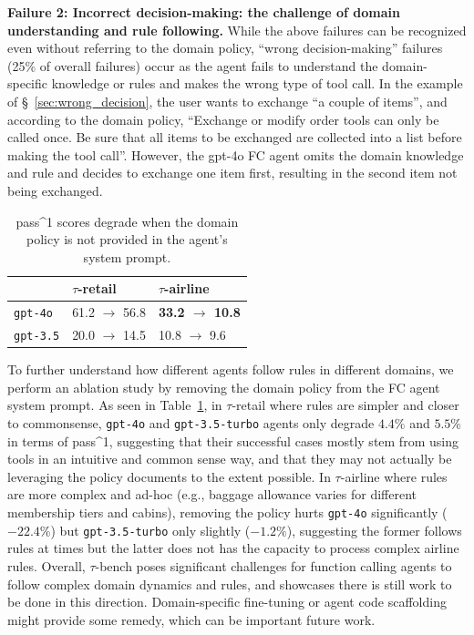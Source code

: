 \documentclass{article}
\newcommand{\benchmark}{$\tau$-bench}
\newcommand{\retail}{$\tau$-retail}  %
\newcommand{\airline}{$\tau$-airline}
\begin{document}
\textbf{Failure 2: Incorrect decision-making: the challenge of domain understanding and rule following.} While the above failures can be recognized even without referring to the domain policy, ``wrong decision-making'' failures (25\% of overall failures) occur as the agent fails to understand the domain-specific knowledge or rules and makes the wrong type of tool call. In the example of \S~\ref{sec:wrong_decision}, the user wants to exchange ``a couple of items'', and according to the domain policy, ``Exchange or modify order tools can only be called once. Be sure that all items to be exchanged are collected into a list before making the tool call''. However, the gpt-4o FC agent omits the domain knowledge and rule and decides to exchange one item first, resulting in the second item not being exchanged. 

\begin{table}
\vspace{-10pt}
    
    \small
    \begin{tabular}{l|ll}
    \toprule
        & \retail & \airline \\
    \midrule
    \texttt{gpt-4o} & 61.2 $\to$ 56.8 & \textbf{33.2 $\to$ 10.8} \\
    \texttt{gpt-3.5} & 20.0 $\to$ 14.5 & 10.8 $\to$ 9.6\\
    \bottomrule
    \end{tabular}
    \caption{pass\textasciicircum 1 scores degrade when the domain policy is not provided in the agent's system prompt.}
    \label{tab:ablate_policy}
    \vspace{0pt}
\end{table}
To further understand how different agents follow rules in different domains, we perform an ablation study by removing the domain policy from the FC agent system prompt. As seen in Table~\ref{tab:ablate_policy}, in \retail{} where rules are simpler and closer to commonsense, \texttt{gpt-4o} and \texttt{gpt-3.5-turbo} agents only degrade $4.4\%$ and $5.5\%$ in terms of pass\textasciicircum 1, suggesting that their successful cases mostly stem from using tools in an intuitive and common sense way, and that they may not actually be leveraging the policy documents to the extent possible. In \airline{} where rules are more complex and ad-hoc (e.g., baggage allowance varies for different membership tiers and cabins), removing the policy hurts \texttt{gpt-4o} significantly ($-22.4\%$) but \texttt{gpt-3.5-turbo} only slightly ($-1.2\%$), suggesting the former  follows rules at times but the latter does not has the capacity to process complex airline rules. Overall, \benchmark{} poses significant challenges for function calling agents to follow complex domain dynamics and rules, and showcases there is still work to be done in this direction. Domain-specific fine-tuning or agent code scaffolding might provide some remedy, which can be important future work.
\end{document}
